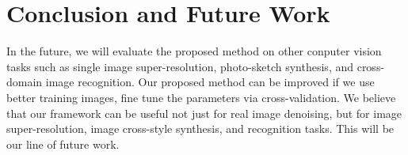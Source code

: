 \documentclass[10pt,twocolumn,letterpaper]{article}
\begin{document}
\section{Conclusion and Future Work}

In the future, we will evaluate the proposed method on other conputer vision tasks such as single image super-resolution, photo-sketch synthesis, and cross-domain image recognition. Our proposed method can be improved if we use better training images, fine tune the parameters via cross-validation. We believe that our framework can be useful not just for real image denoising, but for image super-resolution, image cross-style synthesis, and recognition tasks. This will be our line of future work.

{\small


}
\end{document}
